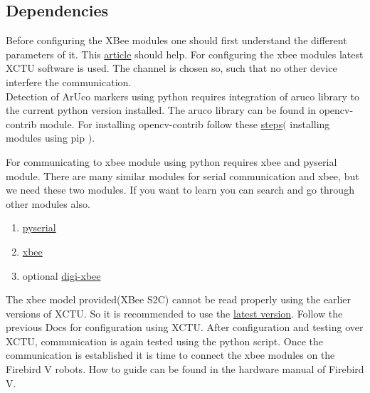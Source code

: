 \documentclass[a4paper,12pt,oneside]{book}
\begin{document}
\subsection{Dependencies}
Before configuring the XBee modules one should first understand the different parameters of it. This \href{https://learn.sparkfun.com/tutorials/exploring-xbees-and-xctu}{article} should help.  For configuring the xbee modules latest XCTU software is used. The channel is chosen so, such that no other device interfere the communication. \\
Detection of ArUco markers using python requires integration of aruco library to the current python version installed. The aruco library can be found in opencv-contrib module. For installing opencv-contrib follow these \href{https://www.youtube.com/watch?v=jnpC_Ib_lbc}{steps}$($ installing modules using pip  $)$. 
\begin{center} 
\framebox{\textcolor{gray}{ pip install opencv-contrib-python }}
\end{center}
For communicating to xbee module using python requires xbee and pyserial module. There are many similar modules for serial communication and xbee, but we need these two modules. If you want to learn you can search and go through other modules also.
\begin{enumerate}
\item \href{https://pypi.org/project/pyserial/}{pyserial}
\begin{center} 
\framebox{\textcolor{gray}{ pip install pyserial }}
\end{center}
\item \href{https://pypi.org/project/XBee/}{xbee}
\begin{center}
\framebox{\textcolor{gray}{ pip install xbee }}
\end{center}
\item optional \href{https://pypi.org/project/digi-xbee/}{digi-xbee}
\begin{center}
\fbox{\textcolor{gray}{ pip install digi-xbee }}
\end{center}
\end{enumerate}\vspace{0 em}
The xbee model provided(XBee S2C) cannot be read properly using the earlier versions of XCTU. So it is recommended to use the \href{https://www.digi.com/support/productdetail?pid=3352&type=utilities}{latest version}. Follow the previous Docs for configuration using XCTU. After configuration and testing over XCTU, communication is again tested using the python script. Once the communication is established it is time to connect the xbee modules on the Firebird V robots. How to guide can be found in the hardware manual of Firebird V.\\
\end{document}
